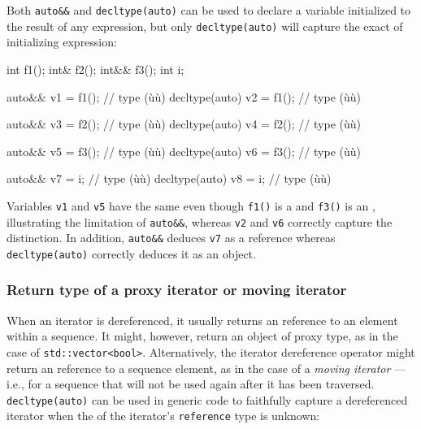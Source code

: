 Both \lstinline!auto&&! and \lstinline!decltype(auto)! can be used to
declare a variable initialized to the result of any expression, but only
\lstinline!decltype(auto)! will capture the exact 
of initializing expression:

\begin{emcppslisting}[emcppsstandards={c++14}]
int   f1();
int&  f2();
int&& f3();
int   i;

auto&&         v1 = f1();  // type (ù{}ù)
decltype(auto) v2 = f1();  // type (ù{}ù)

auto&&         v3 = f2();  // type (ù{}ù)
decltype(auto) v4 = f2();  // type (ù{}ù)

auto&&         v5 = f3();  // type (ù{}ù)
decltype(auto) v6 = f3();  // type (ù{}ù)

auto&&         v7 = i;     // type (ù{}ù)
decltype(auto) v8 = i;     // type (ù{}ù)
\end{emcppslisting}
    

Variables \lstinline!v1! and \lstinline!v5! have the same  even though \lstinline!f1()! is a  and
\lstinline!f3()! is an , illustrating the limitation of
\lstinline!auto&&!, whereas \lstinline!v2! and \lstinline!v6! correctly capture
the distinction. In addition, \lstinline!auto&&! deduces \lstinline!v7! as a
reference whereas \lstinline!decltype(auto)! correctly deduces it as an
object.

\subsubsection[Return type of a proxy iterator or moving iterator]{Return type of a proxy iterator or moving iterator}\label{return-type-of-a-proxy-iterator-or-moving-iterator}

When an iterator is dereferenced, it usually returns an 
reference to an element within a sequence. It might, however, return an
 object of proxy type, as in the case of
\lstinline!std::vector<bool>!. Alternatively, the iterator dereference
operator might return an  reference to a sequence element,
as in the case of a \emph{moving iterator} --- i.e., for a sequence that
will not be used again after it has been traversed.
\lstinline!decltype(auto)! can be used in generic code to faithfully
capture a dereferenced iterator when the  of the
iterator's \lstinline!reference! type is unknown:

